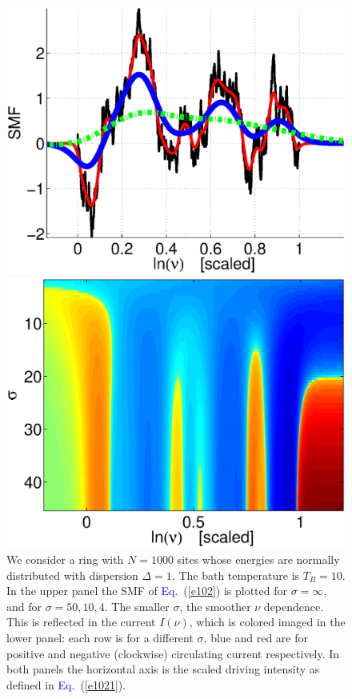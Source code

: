 \documentclass[aps,pre,floats,floatfix,twocolumn]{revtex4}
\newcommand{\Eq}[1]{\textcolor{blue}{Eq.\!\!~(\ref{#1})}}
\begin{document}
\begin{figure}
\includegraphics[width=\hsize]{SMF_RW.eps}

\vspace*{5mm}

\includegraphics[width=\hsize]{I_sig_tau.eps}

\caption{
We consider a ring with ${N=1000}$ sites whose energies 
are normally distributed with dispersion ${\Delta=1}$.
The bath temperature is $T_B=10$. In the upper panel 
the SMF of \Eq{e102} is plotted for $\sigma=\infty$, 
and for $\sigma=50,10,4$. The smaller $\sigma$, 
the smoother $\nu$ dependence. 
This is reflected in the current $I(\nu)$, which is colored 
imaged in the lower panel: each row is for a different $\sigma$,  
blue and red are for positive and negative (clockwise) 
circulating current respectively.     
In both panels the horizontal axis is 
the scaled driving intensity as defined in \Eq{e1021}.} 
\label{f2}
\end{figure}
\end{document}
